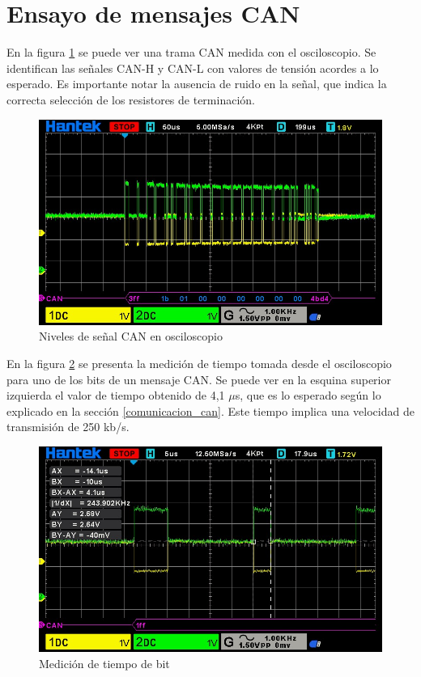 \section{Ensayo de mensajes CAN}

En la figura \ref{fig:niv_señal} se puede ver una trama CAN medida con el osciloscopio. Se identifican las señales CAN-H y CAN-L con valores de tensión acordes a lo esperado. Es importante notar la ausencia de ruido en la señal, que indica la correcta selección de los resistores de terminación.

\begin{figure}[htbp]
	\centering
	\includegraphics[scale=0.6]{./Figures/Message_Change_Operation_Mode_CONFIG.jpg}
	\caption{Niveles de señal CAN en osciloscopio}
	\label{fig:niv_señal}
\end{figure}

En la figura \ref{fig:tiempo_bit_can} se presenta la medición de tiempo tomada desde el osciloscopio para uno de los bits de un mensaje CAN. Se puede ver en la esquina superior izquierda el valor de tiempo obtenido de 4,1 $\mu$s, que es lo esperado según lo explicado en la sección \ref{comunicacion_can}. Este tiempo implica una velocidad de transmisión de 250 kb/s.

\begin{figure}[htbp]
	\centering
	\includegraphics[scale=0.6]{./Figures/bit_time_can.jpeg}
	\caption{Medición de tiempo de bit}
	\label{fig:tiempo_bit_can}
\end{figure}

